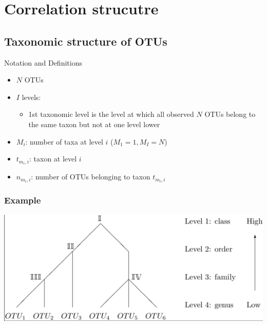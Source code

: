 \documentclass{beamer}
\begin{document}
\section{Correlation strucutre}
\subsection{Taxonomic structure of OTUs}

\begin{frame}[t]{Notation and Definitions}
  \begin{itemize}
    \item $N$ OTUs
    \item $I$ levels:
    \begin{itemize}
      \item 1st taxonomic level is the level at which all observed $N$ OTUs belong to the same taxon but not at one level lower
    \end{itemize}
    \item $M_i$: number of taxa at level $i$ ($M_1 = 1, M_I = N$)
    \item $t_{m_i, i}$: taxon at level $i$
    \item $n_{m_i, i}$: number of OTUs belonging to taxon $t_{m_i,i}$
  \end{itemize}
\end{frame}




\begin{frame}
\frametitle{Example}

\includegraphics[width = \textwidth]{otu_tree.png}

\end{frame}

\end{document}

